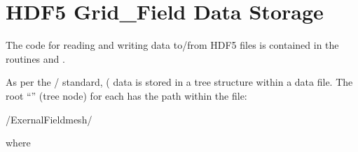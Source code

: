 {{{{{{{{{{%
\section{HDF5 Grid\_Field Data Storage}
\label{s:hdf5.grid}

The code for reading and writing  data to/from HDF5 files is contained in the
routines  and
.

As per the / standard,  ( data is
stored in a tree structure within a data file. The root ``'' (tree node) for each 
has the path within the file:
\begin{example}
  /ExernalFieldmesh/%
\end{example}
where \vn{%

}}}}}}}}}}}
